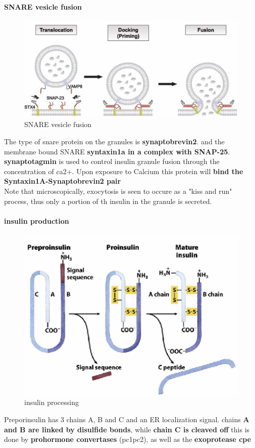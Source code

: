 \documentclass[../main.tex]{subfiles}
\begin{document}
\paragraph{SNARE vesicle fusion}
\begin{figure}[H]
    \centering
    \includegraphics[width=0.5\linewidth]{snare.png}
    \caption{SNARE vesicle fusion }
    \label{fig:enter-label}
\end{figure}
The type of snare protein on the granules is \textbf{\gls{synaptobrevin2}}. and the membrane bound SNARE \textbf{\gls{syntaxin1a} in a complex with SNAP-25}.  \textbf{\gls{synaptotagmin}} is used to control insulin granule fusion through the concentration of ca2+. Upon exposure to Calcium this protein will \textbf{bind the Syntaxin1A-Synaptobrevin2 pair}\\
\indent Note that microscopically, exocytosis is seen to occure as a "kiss and run" process, thus only a portion of th insulin in the granule is secreted.

\paragraph{insulin production}
\begin{figure}[H]
    \centering
    \includegraphics[width=0.5\linewidth]{insulinProduction.png}
    \caption{insulin processing}
    \label{fig:enter-label}
\end{figure}
Preporinsulin has 3 chains A, B and C and an ER localization signal. chains\textbf{ A and B are linked by disulfide bonds}, while \textbf{chain C is cleaved off} this is done by \textbf{prohormone convertases} (\gls{pc1pc2}), as well as the 
\textbf{exoprotease \gls{cpe}}
\end{document}
